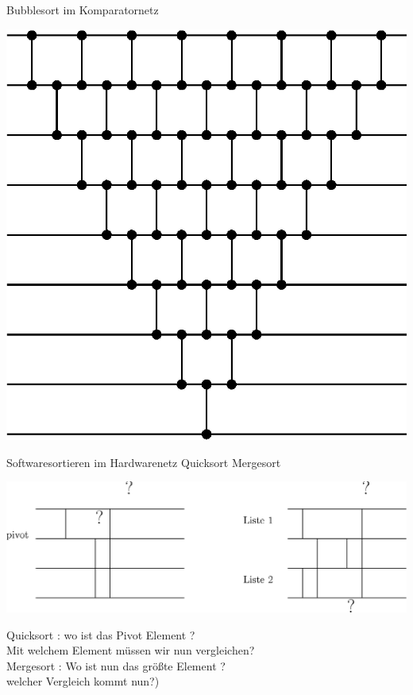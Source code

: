 \documentclass[ucs,9pt]{beamer}
\begin{document}
\begin{frame}{Bubblesort im Komparatornetz}
	\begin{center}
	    \includegraphics[scale=0.65]{bubblesort.eps}
	\end{center}
\end{frame}

\begin{frame}{Softwaresortieren im Hardwarenetz}
\hspace{1cm} Quicksort \hspace{4cm} Mergesort
    \begin{center}
    		\includegraphics[scale=0.65]{mergesort.eps}
\end{center}     
 {Quicksort : wo ist das Pivot Element ?\\ Mit welchem Element müssen wir nun vergleichen?}\\
 {Mergesort : Wo ist nun das größte Element ? \\welcher Vergleich kommt nun?)}
\end{frame}
\end{document}
